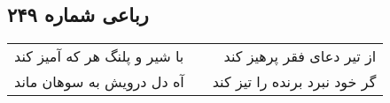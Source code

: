 \begin{center}
\section*{رباعی شماره ۲۴۹}
\label{sec:sh249}
\begin{longtable}{l p{0.5cm} r}
با شیر و پلنگ هر که آمیز کند
&&
از تیر دعای فقر پرهیز کند
\\
آه دل درویش به سوهان ماند
&&
گر خود نبرد برنده را تیز کند
\\
\end{longtable}
\end{center}

